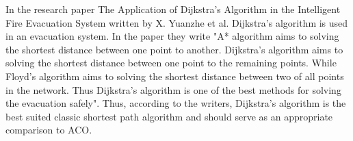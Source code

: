 In the research paper The Application of Dijkstra's Algorithm in the Intelligent Fire Evacuation System \cite{6305611} written by X. Yuanzhe et al. Dijkstra's algorithm is used in an evacuation system. In the paper they write "A* algorithm aims to solving the shortest distance between one point to another. Dijkstra's algorithm aims to solving the shortest distance between one point to the remaining points. While Floyd's algorithm aims to solving the shortest distance between two of all points in the network. Thus Dijkstra's algorithm is one of the best methods for solving the evacuation safely". Thus, according to the writers, Dijkstra's algorithm is the best suited classic shortest path algorithm and should serve as an appropriate comparison to ACO.









